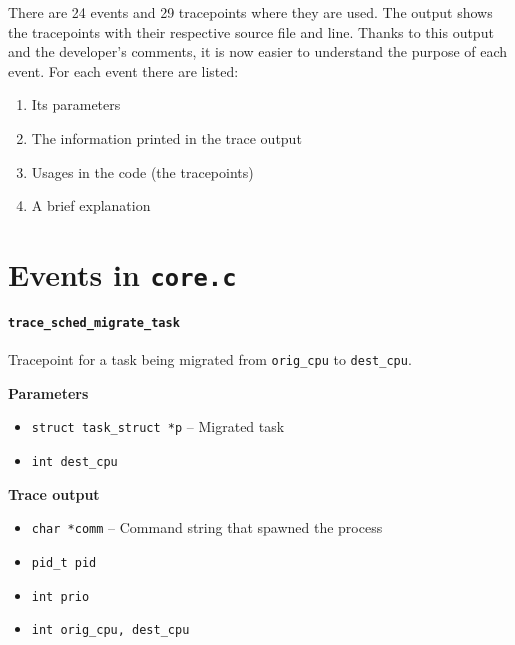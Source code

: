 There are 24 events and 29 tracepoints where they are used. The output shows the tracepoints with their respective source file and line. Thanks to this output and the developer's comments, it is now easier to understand the purpose of each event. For each event there are listed: 
\begin{enumerate}
    \item Its parameters
    \item The information printed in the trace output
    \item Usages in the code (the tracepoints)
    \item A brief explanation
\end{enumerate}

\section{Events in \texttt{core.c}} 
\paragraph{\texttt{trace\_sched\_migrate\_task}}
Tracepoint for a task being migrated from \verb|orig_cpu| to \verb|dest_cpu|.

\textbf{Parameters}
\begin{itemize}
    \item \verb|struct task_struct *p| -- Migrated task
    \item \verb|int dest_cpu|
\end{itemize}

\textbf{Trace output}
\begin{itemize}
    \item \verb|char *comm| -- Command string that spawned the process
    \item \verb|pid_t pid|
    \item \verb|int prio|
    \item \verb|int orig_cpu, dest_cpu|
\end{itemize}

